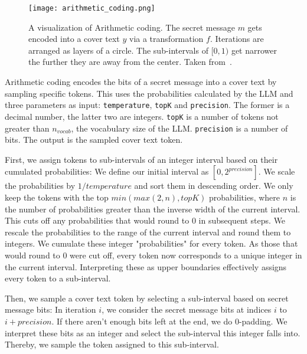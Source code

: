 \begin{figure}
    \begin{wide}
        \captionsetup{width=\linewidth}
        \texttt{[image: arithmetic\_coding.png]}
		\caption[Arithmetic coding]{A visualization of Arithmetic coding. The secret message $m$ gets encoded into a cover text $y$ via a transformation $f$. Iterations are arranged as layers of a circle. The sub-intervals of $ [0, 1) $ get narrower the further they are away from the center. Taken from~\cite{zieglerNeuralLinguisticSteganography2019}.}
        \label{fig:arithmeticCoding}
    \end{wide}
\end{figure}

Arithmetic coding encodes the bits of a secret message into a cover text by sampling specific tokens. This uses the probabilities calculated by the \gls{LLM} and three parameters as input: \lstinline|temperature|, \lstinline|topK| and \lstinline|precision|. The former is a decimal number, the latter two are integers. \lstinline|topK| is a number of tokens not greater than $ n_{vocab} $, the vocabulary size of the \gls{LLM}. \lstinline|precision| is a number of bits. The output is the sampled cover text token.

First, we assign tokens to sub-intervals of an integer interval based on their cumulated probabilities: We define our initial interval as $ [0, 2^{precision}] $. We scale the probabilities by $ 1/temperature $ and sort them in descending order. We only keep the tokens with the top $ min(max(2, n), topK) $ probabilities, where $ n $ is the number of probabilities greater than the inverse width of the current interval. This cuts off any probabilities that would round to 0 in subsequent steps. We rescale the probabilities to the range of the current interval and round them to integers. We cumulate these integer "probabilities" for every token. As those that would round to 0 were cut off, every token now corresponds to a unique integer in the current interval. Interpreting these as upper boundaries effectively assigns every token to a sub-interval.

Then, we sample a cover text token by selecting a sub-interval based on secret message bits: In iteration $ i $, we consider the secret message bits at indices $ i $ to $ i + precision $. If there aren't enough bits left at the end, we do 0-padding. We interpret these bits as an integer and select the sub-interval this integer falls into. Thereby, we sample the token assigned to this sub-interval.

